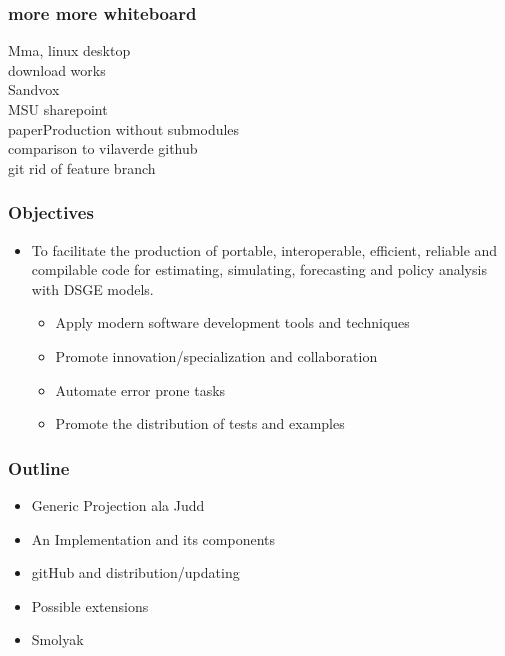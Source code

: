 \documentclass[tikz]{beamer}
\begin{document}
\begin{frame}
  \frametitle{more more whiteboard}
  \begin{description}
  \item[Mma, linux desktop]
  \item[download works]
  \item[Sandvox]
  \item[MSU sharepoint]
  \item[paperProduction without submodules]

  \item[comparison to vilaverde github]
  \item[git rid of feature branch] 
\end{description}
\end{frame}
\begin{frame}
  \frametitle{Objectives}  

{%
\begin{itemize}
\item To facilitate  
the production of  portable, interoperable, efficient, 
 reliable and compilable code  for estimating,  
simulating,  forecasting and  policy analysis with
DSGE models.
  \begin{itemize}
  \item Apply modern software development tools and techniques
  \item Promote innovation/specialization and collaboration 
  \item Automate error prone tasks
  \item Promote the distribution of tests and examples
  \end{itemize}
\end{itemize}
}
\end{frame}

\begin{frame}
  \frametitle{Outline}
  \begin{itemize}
  \item Generic Projection ala Judd
  \item An Implementation  and its components

  \item gitHub and distribution/updating
  \item Possible extensions

  \item Smolyak
  \end{itemize}
\end{frame}
\end{document}
